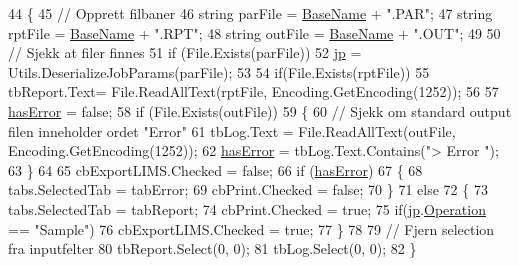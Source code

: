\begin{DoxyCode}
44         \{
45             \textcolor{comment}{// Opprett filbaner}
46             \textcolor{keywordtype}{string} parFile = \hyperlink{class_scintilab_1_1_form_job_report_ae2edaad73f9347d9cbc70299ea55c8e4}{BaseName} + \textcolor{stringliteral}{".PAR"};
47             \textcolor{keywordtype}{string} rptFile = \hyperlink{class_scintilab_1_1_form_job_report_ae2edaad73f9347d9cbc70299ea55c8e4}{BaseName} + \textcolor{stringliteral}{".RPT"};
48             \textcolor{keywordtype}{string} outFile = \hyperlink{class_scintilab_1_1_form_job_report_ae2edaad73f9347d9cbc70299ea55c8e4}{BaseName} + \textcolor{stringliteral}{".OUT"};
49 
50             \textcolor{comment}{// Sjekk at filer finnes}
51             \textcolor{keywordflow}{if} (File.Exists(parFile))
52                 \hyperlink{class_scintilab_1_1_form_job_report_abf5ab85e5b06729f1494a9e1c6877d7e}{jp} = Utils.DeserializeJobParams(parFile);
53 
54             \textcolor{keywordflow}{if}(File.Exists(rptFile))
55                 tbReport.Text= File.ReadAllText(rptFile, Encoding.GetEncoding(1252));
56 
57             \hyperlink{class_scintilab_1_1_form_job_report_aa9d718d9966b2d6263142d811c4690ef}{hasError} = \textcolor{keyword}{false};
58             \textcolor{keywordflow}{if} (File.Exists(outFile))
59             \{
60                 \textcolor{comment}{// Sjekk om standard output filen inneholder ordet "Error"}
61                 tbLog.Text = File.ReadAllText(outFile, Encoding.GetEncoding(1252));
62                 \hyperlink{class_scintilab_1_1_form_job_report_aa9d718d9966b2d6263142d811c4690ef}{hasError} = tbLog.Text.Contains(\textcolor{stringliteral}{"> Error "});
63             \}
64 
65             cbExportLIMS.Checked = \textcolor{keyword}{false};
66             \textcolor{keywordflow}{if} (\hyperlink{class_scintilab_1_1_form_job_report_aa9d718d9966b2d6263142d811c4690ef}{hasError})
67             \{
68                 tabs.SelectedTab = tabError;
69                 cbPrint.Checked = \textcolor{keyword}{false};
70             \}
71             \textcolor{keywordflow}{else}
72             \{
73                 tabs.SelectedTab = tabReport;
74                 cbPrint.Checked = \textcolor{keyword}{true};
75                 \textcolor{keywordflow}{if}(\hyperlink{class_scintilab_1_1_form_job_report_abf5ab85e5b06729f1494a9e1c6877d7e}{jp}.\hyperlink{class_scintilab_1_1_job_params_af7aa58322a6e62ae3cc3bd5d216d389b}{Operation} == \textcolor{stringliteral}{"Sample"})
76                     cbExportLIMS.Checked = \textcolor{keyword}{true};
77             \}
78 
79             \textcolor{comment}{// Fjern selection fra inputfelter}
80             tbReport.Select(0, 0);
81             tbLog.Select(0, 0);
82         \}
\end{DoxyCode}


